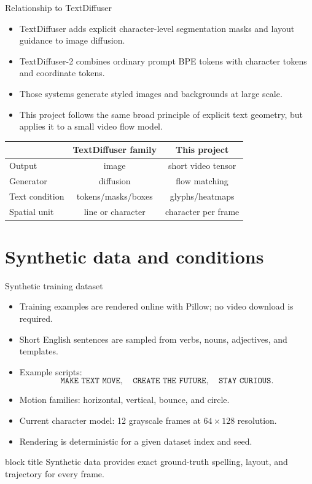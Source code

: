 \documentclass[aspectratio=169,xcolor=svgnames]{beamer}
\newcommand{\keypoint}[1]{%
\begin{center}
\begin{beamercolorbox}[rounded=true,shadow=true,wd=0.88\textwidth,sep=0.6em,center]{block title}
#1
\end{beamercolorbox}
\end{center}
}
\begin{document}
\begin{frame}{Relationship to TextDiffuser}
\begin{itemize}
    \item TextDiffuser adds explicit character-level segmentation masks and layout guidance to image diffusion.
    \item TextDiffuser-2 combines ordinary prompt BPE tokens with character tokens and coordinate tokens.
    \item Those systems generate styled images and backgrounds at large scale.
    \item This project follows the same broad principle of explicit text geometry, but applies it to a small video flow model.
\end{itemize}

\vspace{0.15cm}
\begin{center}
\begin{tabular}{lcc}
\hline
 & TextDiffuser family & This project \\
\hline
Output & image & short video tensor \\
Generator & diffusion & flow matching \\
Text condition & tokens/masks/boxes & glyphs/heatmaps \\
Spatial unit & line or character & character per frame \\
\hline
\end{tabular}
\end{center}
\end{frame}

\section{Synthetic data and conditions}

\begin{frame}{Synthetic training dataset}
\begin{itemize}
    \item Training examples are rendered online with Pillow; no video download is required.
    \item Short English sentences are sampled from verbs, nouns, adjectives, and templates.
    \item Example scripts:
    \[
    \texttt{MAKE TEXT MOVE},\quad
    \texttt{CREATE THE FUTURE},\quad
    \texttt{STAY CURIOUS}.
    \]
    \item Motion families: horizontal, vertical, bounce, and circle.
    \item Current character model: 12 grayscale frames at $64\times128$ resolution.
    \item Rendering is deterministic for a given dataset index and seed.
\end{itemize}

\keypoint{Synthetic data provides exact ground-truth spelling, layout, and trajectory for every frame.}
\end{frame}
\end{document}
